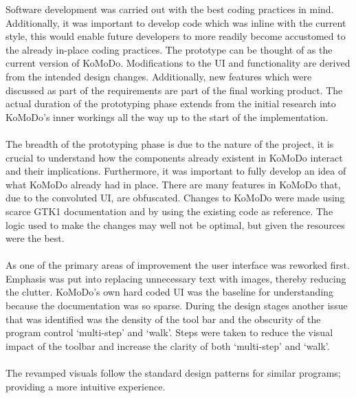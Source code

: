   Software development was carried out with the best coding practices in mind. Additionally, it was important to develop code which was inline with the current style, this would enable future developers to more readily become accustomed to the already in-place coding practices.
  The prototype can be thought of as the current version of KoMoDo. Modifications to the UI and functionality are derived from the intended design changes. Additionally, new features which were discussed as part of the requirements are part of the final working product. The actual duration of the prototyping phase extends from the initial research into KoMoDo's inner workings all the way up to the start of the implementation. \\\\
  The breadth of the prototyping phase is due to the nature of the project, it is crucial to understand how the components already existent in KoMoDo interact and their implications. Furthermore, it was important to fully develop an idea of what KoMoDo already had in place. There are many features in KoMoDo that, due to the convoluted UI, are obfuscated.
  Changes to KoMoDo were made using scarce GTK1 documentation and by using the existing code as reference. The logic used to make the changes may well not be optimal, but given the resources were the best.\\\\
  As one of the primary areas of improvement the user interface was reworked first. Emphasis was put into replacing unnecessary text with images, thereby reducing the clutter. KoMoDo's own hard coded UI was the baseline for understanding  because the documentation was so sparse.
  During the design stages another issue that was identified was the density of the tool bar and the obscurity of the program control `multi-step' and `walk'. Steps were taken to reduce the visual impact of the toolbar and increase the clarity of both `multi-step' and `walk'.\\\\
  The revamped visuals follow the standard design patterns for similar programs; providing a more intuitive experience.\\\\
